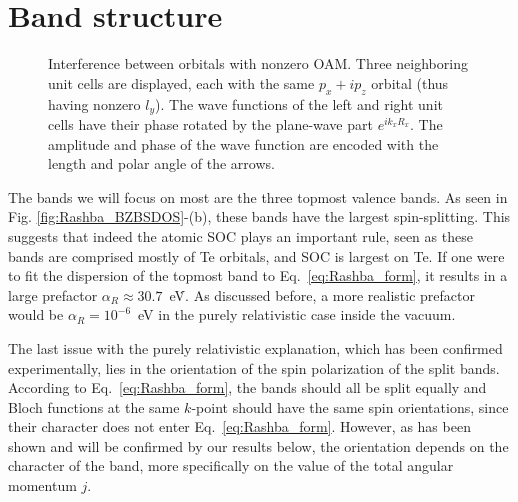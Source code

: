 \section{Band structure}
\begin{figure}[b!]
\caption{\label{fig:interference}Interference between orbitals with nonzero OAM. Three neighboring unit cells are displayed, each with the same $p_x + ip_z$ orbital (thus having nonzero $l_y$). The wave functions of the left and right unit cells have their phase rotated by the plane-wave part $e^{i k_x R_x}$. The amplitude and phase of the wave function are encoded with the length and polar angle of the arrows.}
\end{figure}
The bands we will focus on most are the three topmost valence bands. As seen in Fig. \ref{fig:Rashba_BZBSDOS}-(b), these bands have the largest spin-splitting. This suggests that indeed the atomic SOC plays an important rule, seen as these bands are comprised mostly of Te orbitals, and SOC is largest on Te. If one were to fit the dispersion of the topmost band to Eq.~\ref{eq:Rashba_form},
it results in a large prefactor $\alpha_R\approx 30.7$~eV\.\angstrom \cite{DiSante2013}. As discussed before, a more realistic prefactor would be $\alpha_R=10^{-6}$~eV in the purely relativistic case inside the vacuum.


The last issue with the purely relativistic explanation, which has been confirmed experimentally\cite{Krempasky2015SurfaceSemiconductor}, lies in the orientation of the spin polarization of the split bands. According to Eq.~\ref{eq:Rashba_form}, the bands should all be split equally and Bloch functions at the same $k$-point should have the same spin orientations, since their character does not enter Eq.~\ref{eq:Rashba_form}. However, as has been shown and will be confirmed by our results below, the orientation depends on the character of the band, more specifically on the value of the total angular momentum $j$. 

